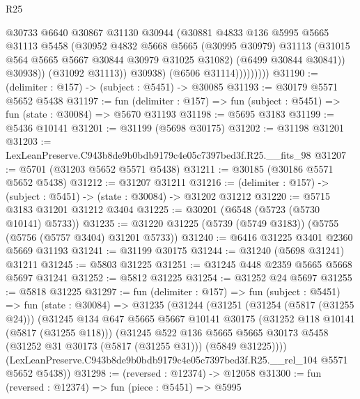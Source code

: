 \begin{lexlean}{R25}
\begin{coremodule}
                          @30733
                          @6640
                          @30867
                          @31130
                          @30944
                          (@30881
                            @4833
                            @136
                            @5995
                            @5665
                            @31113
                            @5458
                            (@30952
                              @4832
                              @5668
                              @5665
                              (@30995 @30979)
                              @31113
                              (@31015 @564 @5665 @5667 @30844 @30979 @31025 @31082)
                              (@6499 @30844 @30841))
                            @30938))
                        (@31092 @31113))
                      @30938)
                    (@6506 @31114)))))))))
@31190 := (delimiter : @157) -> (subject : @5451) -> @30085
@31193 := @30179 @5571 @5652 @5438
@31197 := fun (delimiter : @157) => fun (subject : @5451) => fun (state : @30084) => @5670 @31193
@31198 := @5695 @3183
@31199 := @5436 @10141
@31201 := @31199 (@5698 @30175)
@31202 := @31198 @31201
@31203 := LexLeanPreserve.C943b8de9b0bdb9179c4e05c7397bed3f.R25.__fits_98
@31207 := @5701 (@31203 @5652 @5571 @5438)
@31211 := @30185 (@30186 @5571 @5652 @5438)
@31212 := @31207 @31211
@31216 := (delimiter : @157) -> (subject : @5451) -> (state : @30084) -> @31202 @31212
@31220 := @5715 @3183 @31201 @31212 @3404
@31225 := @30201 (@6548 (@5723 (@5730 @10141) @5733))
@31235 := @31220 @31225 (@5739 (@5749 @3183)) (@5755 (@5756 (@5757 @3404) @31201 @5733))
@31240 := @6416 @31225 @3401 @2360 @5669 @31193
@31241 := @31199 @30175
@31244 := @31240 (@5698 @31241) @31211
@31245 := @5803 @31225
@31251 := @31245 @448 @2359 @5665 @5668 @5697 @31241
@31252 := @5812 @31225
@31254 := @31252 @24 @5697
@31255 := @5818 @31225
@31297 := fun (delimiter : @157) =>
  fun (subject : @5451) =>
  fun (state : @30084) =>
  @31235
    (@31244
      (@31251
        (@31254 (@5817 (@31255 @24)))
        (@31245
          @134
          @647
          @5665
          @5667
          @10141
          @30175
          (@31252 @118 @10141 (@5817 (@31255 @118)))
          (@31245
            @522
            @136
            @5665
            @5665
            @30173
            @5458
            (@31252 @31 @30173 (@5817 (@31255 @31)))
            (@5849 @31225))))
      (LexLeanPreserve.C943b8de9b0bdb9179c4e05c7397bed3f.R25.__rel_104 @5571 @5652 @5438))
@31298 := (reversed : @12374) -> @12058
@31300 := fun (reversed : @12374) => fun (piece : @5451) => @5995

\end{coremodule}
\end{lexlean}
